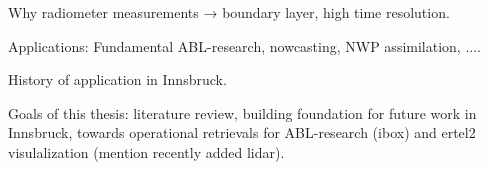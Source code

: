 Why radiometer measurements → boundary layer, high time resolution.

Applications: Fundamental ABL-research, nowcasting, NWP assimilation, ....

History of application in Innsbruck.

Goals of this thesis: literature review, building foundation for future work
in Innsbruck, towards operational retrievals for ABL-research (ibox) and ertel2
visulalization (mention recently added lidar).
